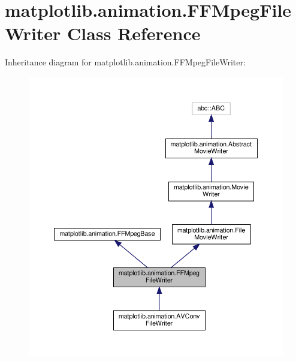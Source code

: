 \hypertarget{classmatplotlib_1_1animation_1_1FFMpegFileWriter}{}\section{matplotlib.\+animation.\+F\+F\+Mpeg\+File\+Writer Class Reference}
\label{classmatplotlib_1_1animation_1_1FFMpegFileWriter}


Inheritance diagram for matplotlib.\+animation.\+F\+F\+Mpeg\+File\+Writer\+:
\nopagebreak
\begin{figure}[H]
\begin{center}
\leavevmode
\includegraphics[width=350pt]{classmatplotlib_1_1animation_1_1FFMpegFileWriter__inherit__graph}
\end{center}
\end{figure}


